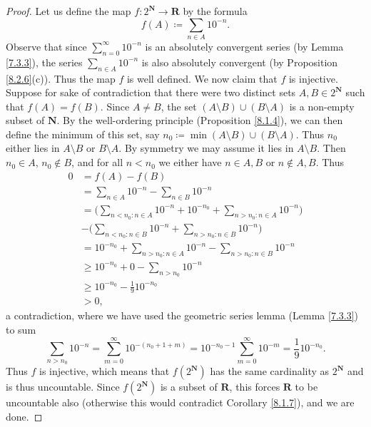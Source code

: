 \begin{proof}
    Let us define the map \(f : 2^{\mathbf{N}} \to \mathbf{R}\) by the formula
    \[
        f(A) \coloneqq \sum_{n \in A} 10^{-n}.
    \]
    Observe that since \(\sum_{n = 0}^\infty 10^{-n}\) is an absolutely convergent series (by Lemma \ref{7.3.3}), the series \(\sum_{n \in A} 10^{-n}\) is also absolutely convergent (by Proposition \ref{8.2.6}(c)).
    Thus the map \(f\)  is well defined.
    We now claim that \(f\) is injective.
    Suppose for sake of contradiction that there were two distinct sets \(A, B \in 2^{\mathbf{N}}\) such that \(f(A) = f(B)\).
    Since \(A \neq B\), the set \((A \setminus B) \cup (B \setminus A)\) is a non-empty subset of \(\mathbf{N}\).
    By the well-ordering principle (Proposition \ref{8.1.4}), we can then define the minimum of this set, say \(n_0 \coloneqq \min(A \setminus B) \cup (B \setminus A)\).
    Thus \(n_0\) either lies in \(A \setminus B\) or \(B \setminus A\).
    By symmetry we may assume it lies in \(A \setminus B\).
    Then \(n_0 \in A\), \(n_0 \notin B\), and for all \(n < n_0\) we either have \(n \in A, B\) or \(n \notin A, B\).
    Thus
    \begin{align*}
        0 & = f(A) - f(B)                                                                                 \\
          & = \sum_{n \in A} 10^{-n} - \sum_{n \in B} 10^{-n}                                             \\
          & = \Bigg(\sum_{n < n_0 : n \in A} 10^{-n} + 10^{-n_0} + \sum_{n > n_0 : n \in A} 10^{-n}\Bigg) \\
          & - \Bigg(\sum_{n < n_0 : n \in B} 10^{-n} + \sum_{n > n_0 : n \in B} 10^{-n}\Bigg)             \\
          & = 10^{-n_0} + \sum_{n > n_0 : n \in A} 10^{-n} - \sum_{n > n_0 : n \in B} 10^{-n}             \\
          & \geq 10^{-n_0} + 0 - \sum_{n > n_0} 10^{-n}                                                   \\
          & \geq 10^{-n_0} - \frac{1}{9} 10^{-n_0}                                                        \\
          & > 0,
    \end{align*}
    a contradiction, where we have used the geometric series lemma (Lemma \ref{7.3.3}) to sum
    \[
        \sum_{n > n_0} 10^{-n} = \sum_{m = 0}^\infty 10^{-(n_0 + 1 + m)} = 10^{-n_0 - 1} \sum_{m = 0}^\infty 10^{-m} = \frac{1}{9} 10^{-n_0}.
    \]
    Thus \(f\) is injective, which means that \(f(2^{\mathbf{N}})\) has the same cardinality as \(2^{\mathbf{N}}\) and is thus uncountable.
    Since \(f(2^{\mathbf{N}})\) is a subset of \(\mathbf{R}\), this forces \(\mathbf{R}\) to be uncountable also (otherwise this would contradict Corollary \ref{8.1.7}), and we are done.
\end{proof}


